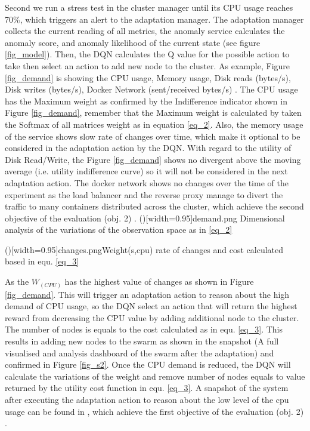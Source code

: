 \documentclass{ieeeaccess}
\begin{document}
Second we run a stress test in the cluster manager until its CPU usage reaches 70\%, which triggers an alert to the adaptation manager. The adaptation manager collects the current reading of all metrics, the anomaly service calculates the anomaly score, and anomaly likelihood of the current state (see figure \ref{fig_model}). Then, the DQN calculates the Q value for the possible action to take then select an action to add new node to the cluster. As example, Figure \ref{fig_demand} is showing the CPU usage, Memory usage, Disk reads (bytes/s), Disk writes (bytes/s), Docker Network (sent/received bytes/s) . The CPU usage has the Maximum weight as confirmed by the  Indifference indicator shown in Figure \ref{fig_demand}, remember that the Maximum weight is calculated by taken the Softmax of all matrices weight as in equation \ref{eq_2}. Also, the memory usage of the service shows slow rate of changes over time, which make it optional to be considered in the adaptation action  by the DQN. With regard to the utility of Disk Read/Write, the Figure \ref{fig_demand} shows no divergent above the moving average (i.e. utility indifference curve) so it will not be considered in the next adaptation action. The docker network shows no changes over the time of the experiment as the load balancer and the reverse proxy manage to divert the traffic to many containers distributed across the cluster, which achieve the second objective of the evaluation (obj. 2) .
\Figure[!t]()[width=0.95\textwidth]{demand.png}
   {Dimensional analysis of the variations of the observation space as in \ref{eq_2} \label{fig_demand}}
   
 \Figure[!t]()[width=0.95\textwidth]{changes.png}{Weight(s,cpu) rate of changes and cost calculated based in equ. \ref{eq_3}  \label{fig_changes}}
   
  
As the $W_(CPU)$ has the highest value of changes as shown in Figure \ref{fig_demand}. This will trigger an adaptation action to reason about the high demand of CPU usage, so the DQN  select an action that will return the highest reward from decreasing the CPU value by adding additional node to the cluster. The number of nodes is equals to the cost calculated as in equ. \ref{eq_3}. This results in adding new nodes to the swarm as shown in the snapshot \cite{snapshot1} (A full visualised and analysis dashboard of the swarm after the adaptation) and confirmed in Figure \ref{fig_s2}.
Once the CPU demand is reduced, the DQN  will calculate the variations of the weight and remove number of nodes equals to value returned by the utility cost function in equ. \ref{eq_3}. A snapshot  of the system after executing the adaptation action to reason about the low level of the cpu usage can be found in \cite{snapshot2}, which achieve the first objective of the evaluation (obj. 2) . 
\end{document}
